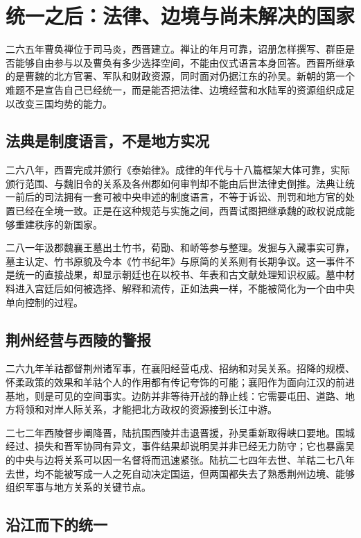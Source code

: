 \section{统一之后：法律、边境与尚未解决的国家}
\label{sec:western-jin-unification-law-frontiers}

二六五年曹奂禅位于司马炎，西晋建立。禅让的年月可靠，诏册怎样撰写、群臣是否能够自由参与以及曹奂有多少选择空间，不能由仪式语言本身回答。西晋所继承的是曹魏的北方官署、军队和财政资源，同时面对仍据江东的孙吴。新朝的第一个难题不是宣告自己已经统一，而是能否把法律、边境经营和水陆军的资源组织成足以改变三国均势的能力。

\subsection{法典是制度语言，不是地方实况}

二六八年，西晋完成并颁行《泰始律》。成律的年代与十八篇框架大体可靠，实际颁行范围、与魏旧令的关系及各州郡如何审判却不能由后世法律史倒推。法典让统一前后的司法拥有一套可被中央申述的制度语言，不等于诉讼、刑罚和地方官的处置已经在全境一致。正是在这种规范与实施之间，西晋试图把继承魏的政权说成能够重建秩序的新国家。

二八一年汲郡魏襄王墓出土竹书，荀勖、和峤等参与整理。发掘与入藏事实可靠，墓主认定、竹书原貌及今本《竹书纪年》与原简的关系则有长期争议。这一事件不是统一的直接战果，却显示朝廷也在以校书、年表和古文献处理知识权威。墓中材料进入宫廷后如何被选择、解释和流传，正如法典一样，不能被简化为一个由中央单向控制的过程。

\subsection{荆州经营与西陵的警报}

二六九年羊祜都督荆州诸军事，在襄阳经营屯戍、招纳和对吴关系。招降的规模、怀柔政策的效果和羊祜个人的作用都有传记夸饰的可能；襄阳作为面向江汉的前进基地，则是可见的空间事实。边防并非等待开战的静止线：它需要屯田、道路、地方将领和对岸人际关系，才能把北方政权的资源接到长江中游。

二七二年西陵督步阐降晋，陆抗围西陵并击退晋援，孙吴重新取得峡口要地。围城经过、损失和晋军协同有异文，事件结果却说明吴并非已经无力防守；它也暴露吴的中央与边将关系可以因一名督将而迅速紧张。陆抗二七四年去世、羊祜二七八年去世，均不能被写成一人之死自动决定国运，但两国都失去了熟悉荆州边境、能够组织军事与地方关系的关键节点。

\subsection{沿江而下的统一}

